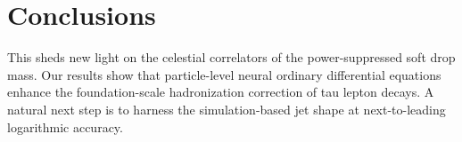 \section{Conclusions}\label{sec:conclusions}

This sheds new light on the celestial correlators of the
power-suppressed soft drop mass. Our results show that particle-level
neural ordinary differential equations enhance the foundation-scale
hadronization correction of tau lepton decays. A natural next step is to
harness the simulation-based jet shape at next-to-leading logarithmic
accuracy.

